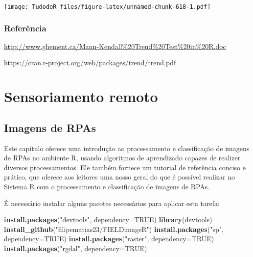 \documentclass[
]{book}
\newenvironment{Shaded}{\begin{snugshade}}{\end{snugshade}}
\newcommand{\DataTypeTok}[1]{\textcolor[rgb]{0.13,0.29,0.53}{#1}}
\newcommand{\KeywordTok}[1]{\textcolor[rgb]{0.13,0.29,0.53}{\textbf{#1}}}
\newcommand{\NormalTok}[1]{#1}
\newcommand{\OtherTok}[1]{\textcolor[rgb]{0.56,0.35,0.01}{#1}}
\newcommand{\StringTok}[1]{\textcolor[rgb]{0.31,0.60,0.02}{#1}}
\begin{document}
\texttt{[image: TudodoR\_files/figure-latex/unnamed-chunk-618-1.pdf]}

\hypertarget{referuxeancia-8}{%
\subsection{Referência}\label{referuxeancia-8}}

\url{http://www.ghement.ca/Mann-Kendall\%20Trend\%20Test\%20in\%20R.doc}

\url{https://cran.r-project.org/web/packages/trend/trend.pdf}

\hypertarget{sensoriamento-remoto}{%
\chapter{Sensoriamento remoto}\label{sensoriamento-remoto}}

\hypertarget{imagens-de-rpas}{%
\section{Imagens de RPAs}\label{imagens-de-rpas}}

Este capítulo oferece uma introdução ao processamento e classificação de imagens de RPAs no ambiente R, usando algoritmos de aprendizado capazes de realizer diversos processamentos. Ele também fornece um tutorial de referência conciso e prático, que oferece aos leitores uma nosso geral do que é possível realizar no Sistema R com o processamento e classificação de imagens de RPAs.

É necessário instalar alguns pacotes necessários para aplicar esta tarefa:

\begin{Shaded}
\begin{Highlighting}[]
\KeywordTok{install.packages}\NormalTok{(}\StringTok{"devtools"}\NormalTok{, }\DataTypeTok{dependency=}\OtherTok{TRUE}\NormalTok{)}
\KeywordTok{library}\NormalTok{(devtools)}
\KeywordTok{install_github}\NormalTok{(}\StringTok{"filipematias23/FIELDimageR"}\NormalTok{)}
\KeywordTok{install.packages}\NormalTok{(}\StringTok{"sp"}\NormalTok{, }\DataTypeTok{dependency=}\OtherTok{TRUE}\NormalTok{)}
\KeywordTok{install.packages}\NormalTok{(}\StringTok{"raster"}\NormalTok{, }\DataTypeTok{dependency=}\OtherTok{TRUE}\NormalTok{)}
\KeywordTok{install.packages}\NormalTok{(}\StringTok{"rgdal"}\NormalTok{, }\DataTypeTok{dependency=}\OtherTok{TRUE}\NormalTok{)}
\end{Highlighting}
\end{Shaded}
\end{document}

